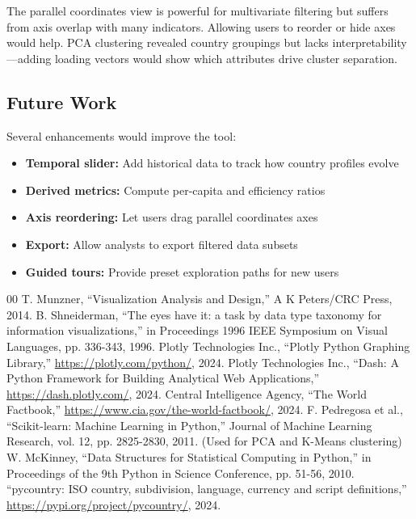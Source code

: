 \documentclass[conference]{IEEEtran}
\begin{document}
{The parallel coordinates view is powerful for multivariate filtering but suffers from axis overlap with many indicators. Allowing users to reorder or hide axes would help. PCA clustering revealed country groupings but lacks interpretability---adding loading vectors would show which attributes drive cluster separation.

\subsection{Future Work}

Several enhancements would improve the tool:
\begin{itemize}
    \item \textbf{Temporal slider:} Add historical data to track how country profiles evolve
    \item \textbf{Derived metrics:} Compute per-capita and efficiency ratios
    \item \textbf{Axis reordering:} Let users drag parallel coordinates axes
    \item \textbf{Export:} Allow analysts to export filtered data subsets
    \item \textbf{Guided tours:} Provide preset exploration paths for new users
\end{itemize}
}

{\color{blue}
\begin{thebibliography}{00}
 T. Munzner, ``Visualization Analysis and Design,'' A K Peters/CRC Press, 2014.
 B. Shneiderman, ``The eyes have it: a task by data type taxonomy for information visualizations,'' in Proceedings 1996 IEEE Symposium on Visual Languages, pp. 336-343, 1996.
 Plotly Technologies Inc., ``Plotly Python Graphing Library,'' \url{https://plotly.com/python/}, 2024.
 Plotly Technologies Inc., ``Dash: A Python Framework for Building Analytical Web Applications,'' \url{https://dash.plotly.com/}, 2024.
 Central Intelligence Agency, ``The World Factbook,'' \url{https://www.cia.gov/the-world-factbook/}, 2024.
 F. Pedregosa et al., ``Scikit-learn: Machine Learning in Python,'' Journal of Machine Learning Research, vol. 12, pp. 2825-2830, 2011. (Used for PCA and K-Means clustering)
 W. McKinney, ``Data Structures for Statistical Computing in Python,'' in Proceedings of the 9th Python in Science Conference, pp. 51-56, 2010.
 ``pycountry: ISO country, subdivision, language, currency and script definitions,'' \url{https://pypi.org/project/pycountry/}, 2024.
\end{thebibliography}
}
\end{document}
